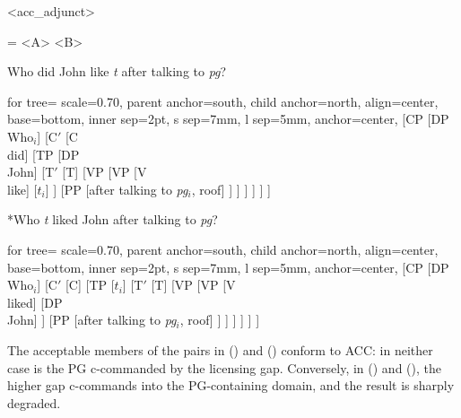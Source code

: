 \documentclass[12pt]{article}
\newcommand{\TwoTreeCols}[2]{%
  \noindent\parbox[t]{0.47\linewidth}{#1}%
  \hspace{1.2em}%
  \parbox[t]{0.47\linewidth}{#2}\par
}
\begin{document}
\xe

\vspace{\baselineskip}

\pex<acc_adjunct>

=\vbox{%
  \a<A>\relax
  \a<B>\relax
}

\TwoTreeCols
{%
   Who did John like \textit{t} after talking to \textit{pg}?%

  \vspace{0.6\baselineskip}
  \centering
  \begin{forest}
  for tree={
    scale=0.70,
    parent anchor=south,
    child anchor=north,
    align=center,
    base=bottom,
    inner sep=2pt,
    s sep=7mm,
    l sep=5mm,
    anchor=center,
  }
  [CP
    [DP\\Who$_i$]
    [C$'$
      [C\\did]
      [TP
        [DP\\John]
        [T$'$
          [T]
          [VP
            [VP
              [V\\like]
              [$t_i$]
            ]
            [PP
              [{after talking to \textit{pg}$_i$}, roof]
            ]
          ]
        ]
      ]
    ]
  ]
  \end{forest}
}
{%
  \getref{acc_adjunct.B} *Who \textit{t} liked John after talking to \textit{pg}?%

  \vspace{0.6\baselineskip}
  \centering
  \begin{forest}
  for tree={
    scale=0.70,
    parent anchor=south,
    child anchor=north,
    align=center,
    base=bottom,
    inner sep=2pt,
    s sep=7mm,
    l sep=5mm,
    anchor=center,
  }
  [CP
    [DP\\Who$_i$]
    [C$'$
      [C]
      [TP
        [$t_i$]
        [T$'$
          [T]
          [VP
            [VP
              [V\\liked]
              [DP\\John]
            ]
            [PP
              [{after talking to \textit{pg}$_i$}, roof]
            ]
          ]
        ]
      ]
    ]
  ]
  \end{forest}
}

\xe

\vspace{\baselineskip}

The acceptable members of the pairs in () and () conform to ACC: in neither case is the PG c-commanded by the licensing gap. Conversely, in () and (), the higher gap c-commands into the PG-containing domain, and the result is sharply degraded.
\end{document}
